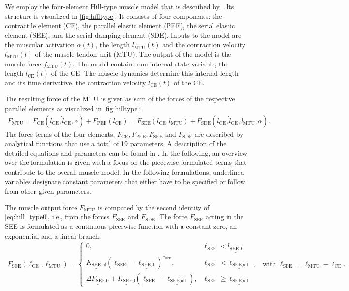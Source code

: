 \newcommand{\CE}{\text{CE}}
\newcommand{\MTU}{\text{MTU}}

We employ the four-element Hill-type muscle model that is described by \cite{Hilltype2014}. Its structure is visualized in \cref{fig:hilltype}. It consists of four components: the contractile element (CE), the parallel elastic element (PEE), the serial elastic element (SEE), and the serial damping element (SDE). Inputs to the model are the muscular activation $\alpha(t)$, the length $l_\MTU(t)$ and the contraction velocity $\dot{l}_\MTU(t)$ of the muscle tendon unit (\ac{MTU}).
The output of the model is the muscle force $f_\text{MTU}(t)$. The model contains one internal state variable, the length $l_\text{CE}(t)$ of the CE. The muscle dynamics determine this internal length and its time derivative, the contraction velocity $\dot{l}_\text{CE}(t)$ of the CE.

The resulting force of the MTU is given as sum of the forces of the respective parallel elements as visualized in \cref{fig:hilltype}:
\begin{equation}\label{eq:hill_type0}
  \begin{array}{lll}
    F_\MTU = F_\CE(l_\CE, \dot{l}_\CE, \alpha) + F_\text{PEE}(l_\CE) = F_\text{SEE}(l_\CE,l_\MTU) + F_\text{SDE}(l_\CE,\dot{l}_\CE,\dot{l}_\MTU,\alpha).
  \end{array}
\end{equation}
The force terms of the four elements, $F_\CE, F_\text{PEE}, F_\text{SEE}$ and $F_\text{SDE}$ are described by analytical functions that use a total of 19 parameters. A description of the detailed equations and parameters can be found in \cite{Hilltype2014}. In the following, an overview over the formulation is given with a focus on the piecewise formulated terms that contribute to the overall muscle model. In the following formulations, underlined variables designate constant parameters that either have to be specified or follow from other given parameters.

The muscle output force $F_\text{MTU}$ is computed by the second identity of \cref{eq:hill_type0}, i.e., from the forces $F_\text{SEE}$ and $F_\text{SDE}$. The force $F_\text{SEE}$ acting in the SEE is formulated as a continuous piecewise function with a constant zero, an exponential and a linear branch:
\begin{equation*}
  \begin{array}{lll}
    F_\text{SEE}(\ell_\CE,\ell_\MTU) = \begin{cases}
      0, & \ell_\text{SEE} < \underline{l_{\text{SEE},0}}\\[2mm]
      \underline{K_\text{SEE,nl}}(\ell_\text{SEE} - \underline{\ell_\text{SEE,0}})^{\underline{\nu_\text{SEE}}}, & \ell_\text{SEE} < \underline{\ell_\text{SEE,nll}}\\[2mm]
    \underline{\Delta F_\text{SEE,0}} + \underline{K_\text{SEE,l}}(\ell_\text{SEE} - \underline{\ell_\text{SEE,nll}}), & 
    \ell_\text{SEE} \geq \underline{\ell_\text{SEE,nll}}
    \end{cases}, \quad \text{with } \ell_\text{SEE} = \ell_\MTU - \ell_\CE.
  \end{array}
\end{equation*}

